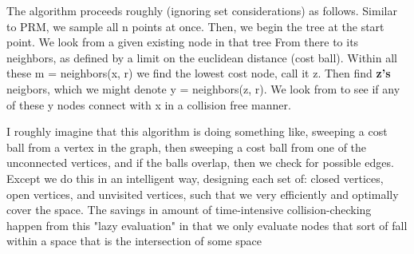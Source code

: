 \documentclass[a4paper]{article}
\begin{document}
The algorithm proceeds roughly (ignoring set considerations) as follows. 
Similar to PRM, we sample all n points at once. Then, we begin the tree at the start
point. We look from a given existing node in that tree From there to its
neighbors, as defined by a limit on the euclidean distance (cost ball). Within
all these m = neighbors(x, r) we find the lowest cost node, call it z. Then find \textbf{z's}
neigbors, which we might denote y = neighbors(z, r). We look from to see if any
of these y nodes connect with x in a collision free manner.

I roughly imagine that this algorithm is doing something like, sweeping a cost
ball from a vertex in the graph, then sweeping a cost ball from one of the
unconnected vertices, and if the balls overlap, then we check for possible
edges. Except we do this in an intelligent way, designing each set of: closed
vertices, open vertices, and unvisited vertices, such that we very efficiently
and optimally cover the space. The savings in amount of time-intensive
collision-checking happen from this "lazy evaluation" in that we only evaluate
nodes that sort of fall within a space that is the intersection of some space
\end{document}
